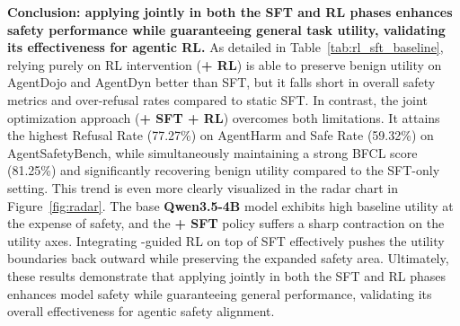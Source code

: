 \textbf{Conclusion: applying \toolAG{} jointly in both the SFT and RL phases enhances safety performance while guaranteeing general task utility, validating its effectiveness for agentic RL.}  
As detailed in Table~\ref{tab:rl_sft_baseline}, relying purely on RL intervention (\textbf{+ RL}) is able to preserve benign utility on AgentDojo and AgentDyn better than SFT, but it falls short in overall safety metrics and over-refusal rates compared to static SFT. In contrast, the joint optimization approach (\textbf{+ SFT + RL}) overcomes both limitations. It attains the highest Refusal Rate (77.27\%) on AgentHarm and Safe Rate (59.32\%) on AgentSafetyBench, while simultaneously maintaining a strong BFCL score (81.25\%) and significantly recovering benign utility compared to the SFT-only setting. This trend is even more clearly visualized in the radar chart in Figure~\ref{fig:radar}. The base \textbf{Qwen3.5-4B} model exhibits high baseline utility at the expense of safety, and the \textbf{+ SFT} policy suffers a sharp contraction on the utility axes. Integrating \toolAG{}-guided RL on top of SFT effectively pushes the utility boundaries back outward while preserving the expanded safety area. Ultimately, these results demonstrate that applying \toolAG{} jointly in both the SFT and RL phases enhances model safety while guaranteeing general performance, validating its overall effectiveness for agentic safety alignment.
